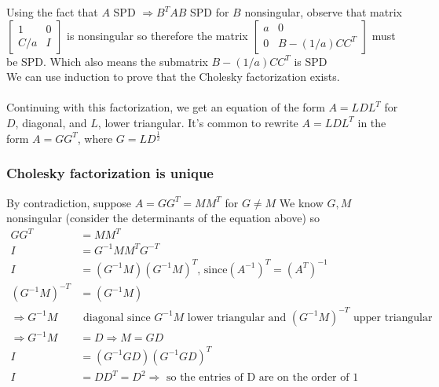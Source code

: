 \documentclass{article}
\begin{document}
\noindent Using the fact that $A$ SPD $\Rightarrow B^TAB$ SPD for $B$ nonsingular, observe that matrix $\begin{bmatrix} 1 & 0\\ C/a &  I\end{bmatrix}$ is nonsingular so therefore the matrix $\begin{bmatrix} a & 0\\ 0 & B - (1/a)CC^T \end{bmatrix}$ must be SPD. Which also means the submatrix $B - (1/a)CC^T$ is SPD \\
We can use induction to prove that the Cholesky factorization exists.
\\ \\
Continuing with this factorization, we get an equation of the form $A = LDL^T$ for $D$, diagonal, and $L$, lower triangular. It's common to rewrite $A = LDL^T$ in the form $A = GG^T$, where $G = LD^{\frac{1}{2}}$

\subsubsection{Cholesky factorization is unique}
By contradiction, suppose $A = GG^T = MM^T$ for $G \neq M$
We know $G, M$ nonsingular (consider the determinants of the equation above) so
\begin{align*}
    GG^T &= MM^T\\
    I &= G^{-1}MM^TG^{-T}\\
    I &= (G^{-1}M)(G^{-1}M)^T \textrm{, since} (A^{-1})^T = (A^T)^{-1}\\
    (G^{-1}M)^{-T} &= (G^{-1}M)\\ \Rightarrow G^{-1}M & \textrm{ diagonal since } G^{-1}M \textrm{ lower triangular and } (G^{-1}M)^{-T} \textrm{ upper triangular}\\
    \Rightarrow G^{-1}M &= D \Rightarrow M = GD\\
    I &= (G^{-1}GD)(G^{-1}GD)^T\\
    I &= DD^T = D^2 \Rightarrow \textrm{ so the entries of D are on the order of 1}
\end{align*}

\end{document}
